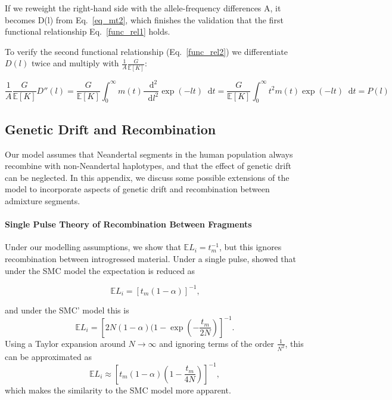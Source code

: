 \documentclass[11pt]{article}
\newcommand*\diff{\mathop{}\!\mathrm{d}}
\let\oldparagraph\paragraph
\renewcommand{\paragraph}[1]{\oldparagraph{#1}\mbox{}}
\begin{document}
If we reweight the right-hand side with the allele-frequency differences A, it becomes D(l) from Eq.~\ref{eq_mt2}, which finishes the validation that the first functional relationship Eq.~\ref{func_rel1} holds.


To verify the second functional relationship (Eq.~\ref{func_rel2}) we differentiate $D(l)$ twice and multiply with $\frac{1}{A}\frac{G}{\mathbb{E}[K]}$:

\begin{equation*}
\frac{1}{A}\frac{G}{\mathbb{E}[K]} D''(l) = 
\frac{G}{\mathbb{E}[K]} \int_0^{\infty} m(t) \frac{\diff^2}{\diff l^2} \exp(-lt) \diff t = 
\frac{G}{\mathbb{E}[K]}\int_0^{\infty} t^2 m(t) \exp(-lt) \diff t = P(l)
\end{equation*}

\subsection{Genetic Drift and Recombination}\label{Appendix_3}
Our model assumes that Neandertal segments in the human population always recombine with non-Neandertal haplotypes, and that the effect of genetic drift can be neglected. In this appendix, we discuss some possible extensions of the model to incorporate aspects of genetic drift and recombination between admixture segments.

\paragraph{Single Pulse Theory of Recombination Between Fragments}
Under our modelling assumptions, we show that $\mathbb{E}L_i = t_m^{-1}$, but this ignores recombination between introgressed material. Under a single pulse, \cite{liang_lengths_2014} showed that under the SMC model \citep{mcvean_approximating_2005}  the expectation is reduced as

\begin{equation}
    \mathbb{E}L_i = \left[t_m (1-\alpha) \right]^{-1} \text{,}
\end{equation}

and under the SMC' model \citep{marjoram_fast_2006} this is
$$
\mathbb{E}L_i = \left[2N(1-\alpha)(1-\exp\left(-\frac{t_m}{2N}\right)\right]^{-1} \text{.}
$$
Using a Taylor expansion around $N \to \infty$ and ignoring terms of the order $\frac{1}{N^2}$, this can be approximated as 
\begin{equation}
  \mathbb{E}L_i \approx  \left[t_m(1-\alpha)\left(1-\frac{t_m}{4N}\right)\right]^{-1},
\end{equation}
which makes the similarity to the SMC model more apparent.
\end{document}
